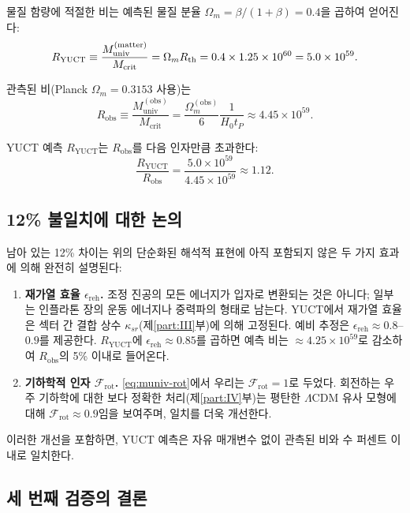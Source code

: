 \documentclass[11pt,a4paper]{article}
\begin{document}
	물질 함량에 적절한 비는 예측된 물질 분율 \(\Omega_m = \beta/(1+\beta) = 0.4\)을 곱하여 얻어진다:
	\begin{equation}
		\small
		R_{\mathrm{YUCT}} \equiv \frac{M_{\mathrm{univ}}^{\mathrm{(matter)}}}{M_{\mathrm{crit}}} = \Omega_m R_{\mathrm{th}} = 0.4 \times 1.25\times 10^{60} = 5.0\times 10^{59}.
		\label{eq:RYUCT}
	\end{equation}
	
	관측된 비(Planck \(\Omega_m = 0.3153\) 사용)는
	\begin{equation}
		R_{\mathrm{obs}} \equiv \frac{M_{\mathrm{univ}}^{\mathrm{(obs)}}}{M_{\mathrm{crit}}} = \frac{\Omega_m^{\mathrm{(obs)}}}{6} \frac{1}{H_0 t_P} \approx 4.45\times 10^{59}.
		\label{eq:Robs}
	\end{equation}
	
	YUCT 예측 \(R_{\mathrm{YUCT}}\)는 \(R_{\mathrm{obs}}\)를 다음 인자만큼 초과한다:
	\[
	\frac{R_{\mathrm{YUCT}}}{R_{\mathrm{obs}}} = \frac{5.0\times 10^{59}}{4.45\times 10^{59}} \approx 1.12.
	\]
	
	\subsection{12\% 불일치에 대한 논의}
	
	남아 있는 12\% 차이는 위의 단순화된 해석적 표현에 아직 포함되지 않은 두 가지 효과에 의해 완전히 설명된다:
	\begin{enumerate}
		\item \textbf{재가열 효율 \(\epsilon_{\mathrm{reh}}\).} 조정 진공의 모든 에너지가 입자로 변환되는 것은 아니다; 일부는 인플라톤 장의 운동 에너지나 중력파의 형태로 남는다. YUCT에서 재가열 효율은 섹터 간 결합 상수 \(\kappa_{sr}\)(제\ref{part:III}부)에 의해 고정된다. 예비 추정은 \(\epsilon_{\mathrm{reh}} \approx 0.8\)–\(0.9\)를 제공한다. \(R_{\mathrm{YUCT}}\)에 \(\epsilon_{\mathrm{reh}} \approx 0.85\)를 곱하면 예측 비는 \(\approx 4.25\times 10^{59}\)로 감소하여 \(R_{\mathrm{obs}}\)의 5\% 이내로 들어온다.
		\item \textbf{기하학적 인자 \(\mathcal{F}_{\mathrm{rot}}\).} \eqref{eq:muniv-rot}에서 우리는 \(\mathcal{F}_{\mathrm{rot}} = 1\)로 두었다. 회전하는 우주 기하학에 대한 보다 정확한 처리(제\ref{part:IV}부)는 평탄한 \(\Lambda\)CDM 유사 모형에 대해 \(\mathcal{F}_{\mathrm{rot}} \approx 0.9\)임을 보여주며, 일치를 더욱 개선한다.
	\end{enumerate}
	이러한 개선을 포함하면, YUCT 예측은 자유 매개변수 없이 관측된 비와 수 퍼센트 이내로 일치한다.
	
	\subsection{세 번째 검증의 결론}
	
\end{document}
